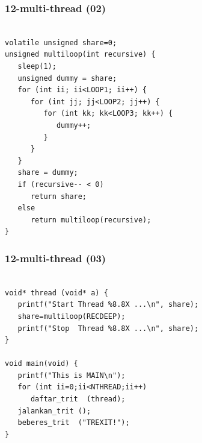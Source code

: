 \documentclass[aspectratio=169, xcolor=table, notheorems, hyperref={pdfpagelabels=false}]{beamer}
\begin{document}
\begin{frame}[fragile]
\frametitle{12-multi-thread (02)}
\begin{lstlisting}[basicstyle=\ttfamily\small]        %  65
% \begin{lstlisting}[basicstyle=\ttfamily\large]        %  54

volatile unsigned share=0;
unsigned multiloop(int recursive) {
   sleep(1);
   unsigned dummy = share;
   for (int ii; ii<LOOP1; ii++) {
      for (int jj; jj<LOOP2; jj++) {
         for (int kk; kk<LOOP3; kk++) {
            dummy++;
         }
      }
   }
   share = dummy;
   if (recursive-- < 0)
      return share;
   else
      return multiloop(recursive);
}

\end{lstlisting}
\end{frame}

\begin{frame}[fragile]
\frametitle{12-multi-thread (03)}
\begin{lstlisting}[basicstyle=\ttfamily\large]        %  54

void* thread (void* a) {
   printf("Start Thread %8.8X ...\n", share);
   share=multiloop(RECDEEP);
   printf("Stop  Thread %8.8X ...\n", share);
}

void main(void) {
   printf("This is MAIN\n");
   for (int ii=0;ii<NTHREAD;ii++)
      daftar_trit  (thread);
   jalankan_trit ();
   beberes_trit  ("TREXIT!");
}

\end{lstlisting}
\end{frame}
\end{document}
